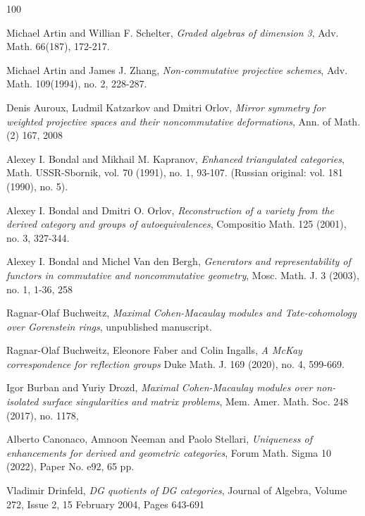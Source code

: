 \documentclass[11pt,reqno]{amsart}
\theoremstyle{definition}
\begin{document}
\begin{thebibliography}{100}

Michael Artin and Willian F. Schelter,
{\it Graded algebras of dimension 3}, 
Adv. Math. 66(187), 172-217.

Michael Artin and James J. Zhang,
{\it Non-commutative projective schemes}, 
 Adv. Math. 109(1994), no. 2, 228-287.


Denis Auroux, Ludmil Katzarkov and Dmitri Orlov, 
{\it Mirror symmetry for weighted projective spaces and
their noncommutative deformations}, Ann. of Math. (2) 167, 2008

Alexey I. Bondal and Mikhail M. Kapranov, 
{\it Enhanced triangulated categories}, 
Math. USSR-Sbornik, vol. 70 (1991), no. 1, 93-107. 
(Russian original: vol. 181 (1990), no. 5).

Alexey I. Bondal and Dmitri O. Orlov,
{\it Reconstruction of a variety from the derived category and groups of autoequivalences},
 Compositio Math. 125 (2001), no. 3, 327-344.

Alexey I. Bondal and Michel Van den Bergh,
{\it Generators and representability of functors in commutative and noncommutative geometry},
Mosc. Math. J. 3 (2003), no. 1, 1-36, 258



Ragnar-Olaf Buchweitz,
{\it Maximal Cohen-Macaulay modules and Tate-cohomology over Gorenstein rings},
unpublished manuscript.



Ragnar-Olaf Buchweitz, Eleonore Faber and Colin Ingalls,
{\it A McKay correspondence for reflection groups}
Duke Math. J. 169 (2020), no. 4, 599-669.



Igor Burban and Yuriy Drozd,
{\it Maximal Cohen-Macaulay modules over non-isolated surface singularities and matrix problems}, 
Mem. Amer. Math. Soc. 248 (2017), no. 1178, 



Alberto Canonaco, Amnoon Neeman and Paolo Stellari, 
{\it Uniqueness of enhancements for derived and geometric categories}, 
Forum Math. Sigma 10 (2022), Paper No. e92, 65 pp. 



Vladimir Drinfeld, 
{\it DG quotients of DG categories},  
Journal of Algebra, Volume 272, Issue 2, 15 February 2004, Pages 643-691




\end{thebibliography}
\end{document}
